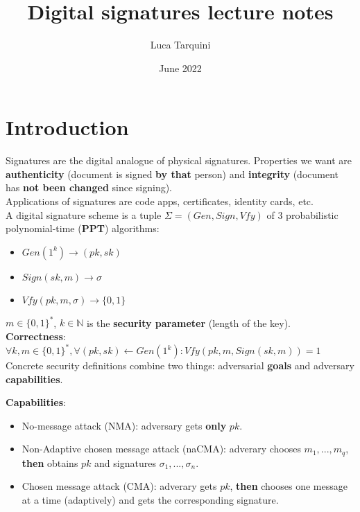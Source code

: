 \documentclass[oneside]{book}
\title{\Huge Digital signatures lecture notes}
\author{\LARGE Luca Tarquini}
\date{\LARGE June 2022}
\newcommand{\N}[0]{\mathbb{N}}
\begin{document}
\maketitle

\tableofcontents

\chapter{Introduction}
Signatures are the digital analogue of physical signatures.
Properties we want are \textbf{authenticity} (document is signed \textbf{by that} person) and \textbf{integrity} (document has \textbf{not been changed} since signing).\\

Applications of signatures are code apps, certificates, identity cards, etc.\\

A digital signature scheme is a tuple $\Sigma{= (Gen, Sign, Vfy)}$ of 3 probabilistic polynomial-time (\textbf{PPT}) algorithms:
\begin{itemize}
    \item $Gen(1^k) \rightarrow (pk,sk)$
    \item $Sign(sk, m) \rightarrow \sigma$
    \item $Vfy(pk, m,\sigma) \rightarrow \{0,1\}$
\end{itemize}

$m \in \{0,1\}^*$, $k \in \N$ is the \textbf{security parameter} (length of the key).\\

\textbf{Correctness}: $\forall k, m \in \{0,1\}^*, \forall (pk, sk) \leftarrow Gen(1^k): Vfy(pk, m, Sign(sk, m)) = 1$\\

Concrete security definitions combine two things: adversarial \textbf{goals} and adversary \textbf{capabilities}.

\textbf{Capabilities}:
\begin{itemize}
    \item No-message attack (NMA): adversary gets \textbf{only} $pk$.
    \item Non-Adaptive chosen message attack (naCMA): adverary chooses $m_1, ..., m_q$, \textbf{then} obtains $pk$ and signatures $\sigma_1, ..., \sigma_n$.
    \item Chosen message attack (CMA): adverary gets $pk$, \textbf{then} chooses one message at a time (adaptively) and gets the corresponding signature.
\end{itemize}
\end{document}
